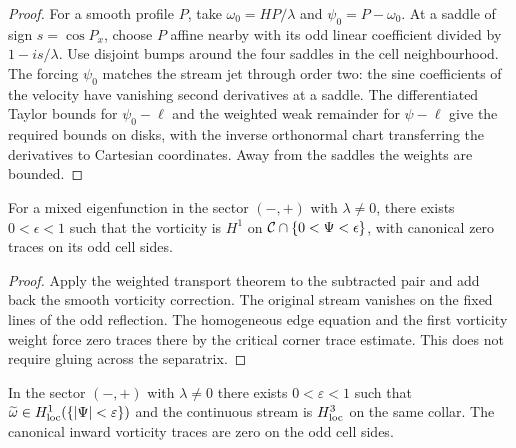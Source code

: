 \begin{proof}
\leanok
For a smooth profile $P$, take $\omega_0=HP/\lambda$ and
$\psi_0=P-\omega_0$. At a saddle of sign $s=\cos P_x$, choose $P$
affine nearby with its odd linear coefficient divided by $1-is/\lambda$.
Use disjoint bumps around the four saddles in the cell neighbourhood.
The forcing $\psi_0$ matches the stream jet through order two:
the sine coefficients of the velocity have vanishing second derivatives
at a saddle. The differentiated Taylor bounds for $\psi_0-\ell$ and the
weighted weak remainder for $\psi-\ell$ give the required bounds on
disks, with the inverse orthonormal chart transferring the derivatives
to Cartesian coordinates. Away from the saddles the weights are bounded.
\end{proof}

\begin{lemma}
\label{lem:mixed-cell-separatrix-h1}
\leanok
For a mixed eigenfunction in the sector $(-,+)$ with $\lambda\ne0$,
there exists $0<\epsilon<1$ such that the vorticity is $H^1$ on
$\mathcal{C}\cap\{0<\Psi<\epsilon\}$, with canonical zero traces on its odd
cell sides.
\end{lemma}

\begin{proof}
\leanok
Apply the weighted transport theorem to the subtracted pair and add back
the smooth vorticity correction. The original stream vanishes on the
fixed lines of the odd reflection. The homogeneous edge equation and the
first vorticity weight force zero traces there by the critical corner
trace estimate. This does not require gluing across the separatrix.
\end{proof}

\begin{lemma}
\label{lem:mixed-separatrix-h1}
\leanok
In the sector $(-,+)$ with $\lambda\ne0$ there exists $0<\varepsilon<1$
such that $\widetilde\omega\in H^1_{\rm loc}(\{|\Psi|<\varepsilon\})$
and the continuous stream is $H^3_{\rm loc}$ on the same collar.
The canonical inward vorticity traces are zero on the odd cell sides.
\end{lemma}

